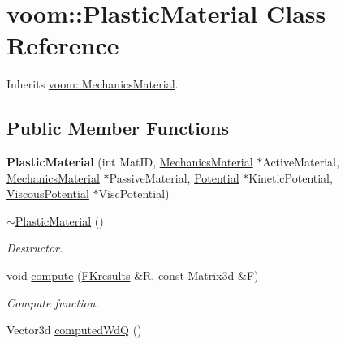 \hypertarget{classvoom_1_1_plastic_material}{
\section{voom::PlasticMaterial Class Reference}
\label{classvoom_1_1_plastic_material}
}


Inherits \hyperlink{classvoom_1_1_mechanics_material}{voom::MechanicsMaterial}.\subsection*{Public Member Functions}
\begin{DoxyCompactItemize}
\item 
\hypertarget{classvoom_1_1_plastic_material_a20d47c770be354c31d296e0739045619}{
{\bfseries PlasticMaterial} (int MatID, \hyperlink{classvoom_1_1_mechanics_material}{MechanicsMaterial} $\ast$ActiveMaterial, \hyperlink{classvoom_1_1_mechanics_material}{MechanicsMaterial} $\ast$PassiveMaterial, \hyperlink{classvoom_1_1_potential}{Potential} $\ast$KineticPotential, \hyperlink{classvoom_1_1_viscous_potential}{ViscousPotential} $\ast$ViscPotential)}
\label{classvoom_1_1_plastic_material_a20d47c770be354c31d296e0739045619}

\item 
\hypertarget{classvoom_1_1_plastic_material_af26654bca102e9ac426e5a01d11dd485}{
\hyperlink{classvoom_1_1_plastic_material_af26654bca102e9ac426e5a01d11dd485}{$\sim$PlasticMaterial} ()}
\label{classvoom_1_1_plastic_material_af26654bca102e9ac426e5a01d11dd485}

\begin{DoxyCompactList}\small\item\em Destructor. \item\end{DoxyCompactList}\item 
\hypertarget{classvoom_1_1_plastic_material_a714ba24594efdba099f79b6da74cb879}{
void \hyperlink{classvoom_1_1_plastic_material_a714ba24594efdba099f79b6da74cb879}{compute} (\hyperlink{structvoom_1_1_mechanics_material_1_1_f_kresults}{FKresults} \&R, const Matrix3d \&F)}
\label{classvoom_1_1_plastic_material_a714ba24594efdba099f79b6da74cb879}

\begin{DoxyCompactList}\small\item\em Compute function. \item\end{DoxyCompactList}\item 
\hypertarget{classvoom_1_1_plastic_material_af0a7c1b596b35566107c86e9aa0d11c6}{
Vector3d \hyperlink{classvoom_1_1_plastic_material_af0a7c1b596b35566107c86e9aa0d11c6}{computedWdQ} ()}
\label{classvoom_1_1_plastic_material_af0a7c1b596b35566107c86e9aa0d11c6}


\end{DoxyCompactItemize}
